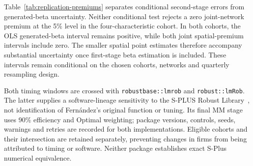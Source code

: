 \documentclass[11pt]{article}
\begin{document}
\begin{table}[htbp]
  \centering\small
  
  \caption{Common-four spatial-lag IV estimates and generated-beta bootstrap
    uncertainty. Conditional $p$-values hold estimated betas fixed; bootstrap
    intervals recompute first-stage estimates and can cross the
    stability bounds.
  Networks remain fixed during resampling.}
\end{table}

\begin{table}[htbp]
  \centering\footnotesize
  
  \caption{Market-premium uncertainty in both primary replication cohorts.
    Four and Three denote the numbers of required characteristics. Premiums
    and percentile-interval endpoints are percentages; conditional standard
    errors are percentage points. The spatial specifications use the joint
    characteristic network with zero self-links. Bootstrap intervals jointly
    resample quarters and re-estimate MM betas and median outcomes, holding
  each cohort and network fixed.}\label{tab:replication-premiums}
\end{table}

Table~\ref{tab:replication-premiums} separates conditional second-stage errors
from generated-beta uncertainty. Neither conditional test rejects a zero
joint-network premium at the 5\% level in the four-characteristic cohort.
In both cohorts, the OLS generated-beta interval remains positive, while
both joint spatial-premium intervals include zero.
The smaller spatial point estimates therefore accompany substantial uncertainty
once first-stage beta estimation is included. These intervals remain
conditional on the chosen cohorts, networks and quarterly resampling design.

\begin{table}[htbp]
  \centering\footnotesize
  
  \caption{Timing and MM software sensitivities on intersection cohorts.
    Each timing window is crossed with both MM packages; beta slopes and
    standard errors are percentage points. All networks are recomputed on the
    reported cohort. Inference is conditional on estimated betas and networks;
    the generated-beta bootstrap remains attached to the primary
  benchmark.}\label{tab:replication-sensitivity}
\end{table}

Both timing windows are crossed with \texttt{robustbase::lmrob} and
\texttt{robust::lmRob}. The latter supplies a software-lineage sensitivity to
the S-PLUS Robust Library~\cite{robustpackage}, not identification of
Fern\'andez's original function
or tuning. Its final MM stage uses 90\% efficiency and Optimal weighting;
package versions, controls, seeds, warnings and retries are recorded for both
implementations. Eligible cohorts and their intersection are retained
separately, preventing changes in firms from being attributed to timing or
software. Neither package establishes exact S-Plus numerical equivalence.
\end{document}
